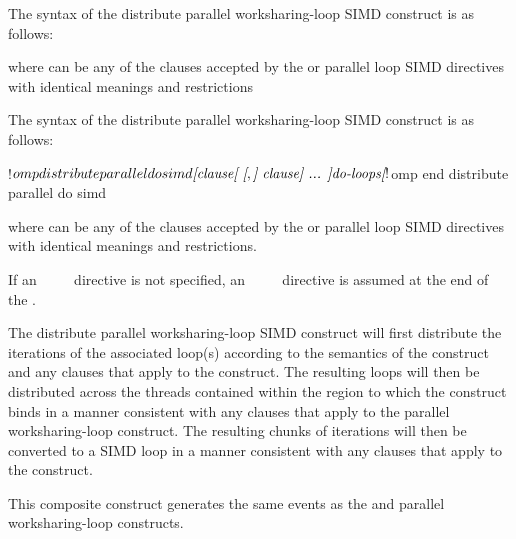 \syntax
\begin{ccppspecific}
The syntax of the distribute parallel worksharing-loop SIMD construct is as follows:

\begin{ompcPragma}
#pragma omp distribute parallel for simd \plc{\}
            \plc{[clause[ [},\plc{] clause] ... ] newline}
    \plc{for-loops}
\end{ompcPragma}

where  can be any of the clauses accepted by the  or parallel loop
SIMD directives with identical meanings and restrictions
\end{ccppspecific}

\begin{fortranspecific}
The syntax of the distribute parallel worksharing-loop SIMD construct is as follows:

\begin{ompfPragma}
!$omp distribute parallel do simd \plc{[clause[ [},\plc{] clause] ... ]}
    \plc{do-loops}
\plc{[}!$omp end distribute parallel do simd\plc{]}
\end{ompfPragma}

where  can be any of the clauses accepted by the  or parallel loop
SIMD directives with identical meanings and restrictions.

If an ~~~~ directive is not specified, an
~~~~ directive is assumed at the end of the .
\end{fortranspecific}

\descr
The distribute parallel worksharing-loop SIMD construct will first distribute the iterations of the
associated loop(s) according to the semantics of the  construct and any
clauses that apply to the  construct. The resulting loops will then be
distributed across the threads contained within the  region to which the
 construct binds in a manner consistent with any clauses that apply to the
parallel worksharing-loop construct. The resulting chunks of iterations will then be converted to a
SIMD loop in a manner consistent with any clauses that apply to the  construct.

\events

This composite construct generates the same events as the  and parallel worksharing-loop constructs.

